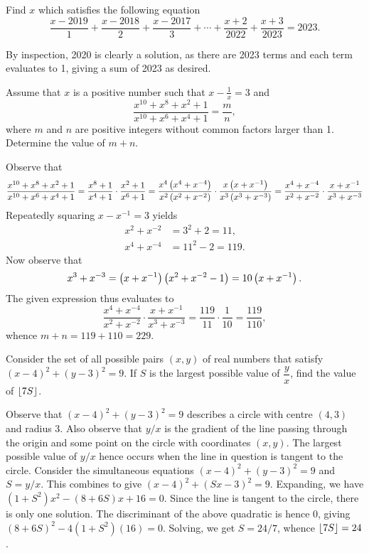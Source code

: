 \begin{question}[2020]\label{A::2023-O-1-12}
    Find $x$ which satisfies the following equation \[\dfrac{x-2019}{1} + \dfrac{x-2018}{2} + \dfrac{x-2017}{3} + \cdots + \dfrac{x+2}{2022} + \dfrac{x+3}{2023} = 2023.\]
\end{question}
\begin{solution*}
    By inspection, 2020 is clearly a solution, as there are 2023 terms and each term evaluates to 1, giving a sum of 2023 as desired.
\end{solution*}

\begin{question}[229]\label{A::2023-O-1-13}
    Assume that $x$ is a positive number such that $x - \frac1x = 3$ and \[\dfrac{x^{10} + x^8 + x^2 + 1}{x^{10} + x^6 + x^4 + 1} = \dfrac{m}{n},\] where $m$ and $n$ are positive integers without common factors larger than 1. Determine the value of $m + n$.
\end{question}
\begin{solution*}
    Observe that \[\frac{x^{10} + x^8 + x^2 + 1}{x^{10} + x^6 + x^4 + 1} = \frac{x^8 + 1}{x^4 + 1} \cdot \frac{x^2+1}{x^6+1} = \frac{x^4\left( x^4 + x^{-4} \right)}{x^2\left( x^2 + x^{-2} \right)} \cdot \frac{x\left( x+x^{-1} \right)}{x^3\left( x^3+x^{-3} \right)} = \frac{x^4 + x^{-4}}{x^2 + x^{-2}} \cdot \frac{x+x^{-1}}{x^3+x^{-3}}\]
    Repeatedly squaring $x - x^{-1} = 3$ yields
    \begin{align*}
        x^2 + x^{-2} &= 3^2 + 2 = 11,\\
        x^4 + x^{-4} &= 11^2 - 2 = 119.
    \end{align*}
    Now observe that \[x^3 + x^{-3} = \left( x + x^{-1} \right)\left( x^2 + x^{-2} - 1 \right) = 10\left( x + x^{-1} \right).\] The given expression thus evaluates to \[\frac{x^4 + x^{-4}}{x^2 + x^{-2}} \cdot \frac{x+x^{-1}}{x^3+x^{-3}} = \frac{119}{11} \cdot \frac1{10} = \frac{119}{110},\] whence $m + n = 119 + 110 = 229$.
\end{solution*}

\begin{question}[24]\label{A::2023-O-1-14}
    Consider the set of all possible pairs $(x, y)$ of real numbers that satisfy $(x-4)^2 + (y-3)^2 = 9$. If $S$ is the largest possible value of $\dfrac{y}{x}$, find the value of $\left\lfloor 7S \right\rfloor$.
\end{question}
\begin{solution*}
    Observe that $(x-4)^2 + (y-3)^2 = 9$ describes a circle with centre $(4, 3)$ and radius 3. Also observe that $y/x$ is the gradient of the line passing through the origin and some point on the circle with coordinates $(x, y)$. The largest possible value of $y/x$ hence occurs when the line in question is tangent to the circle. Consider the simultaneous equations $(x-4)^2 + (y-3)^2 = 9$ and $S = y/x$. This combines to give $(x-4)^2 + (Sx - 3)^2 = 9$. Expanding, we have $(1+S^2)x^2 - (8+6S)x + 16 = 0$. Since the line is tangent to the circle, there is only one solution. The discriminant of the above quadratic is hence 0, giving $(8+6S)^2 - 4(1+S^2)(16) = 0$. Solving, we get $S = 24/7$, whence $\left\lfloor 7S \right\rfloor = 24$.
\end{solution*}

